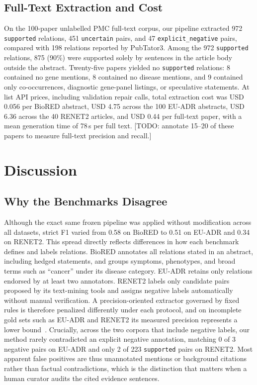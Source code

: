 \documentclass[preprint,10pt,letterpaper]{elsarticle}
\newcommand{\st}[1]{\texttt{#1}}             %
\newcommand{\todo}[1]{\textcolor{stneg}{[TODO: #1]}}
\begin{document}
\subsection{Full-Text Extraction and Cost}
On the 100-paper unlabelled PMC full-text corpus, our pipeline extracted 972 \st{supported} relations, 451 \st{uncertain} pairs, and 47 \st{explicit\_negative} pairs, compared with 198 relations reported by PubTator3. Among the 972 \st{supported} relations, 875 (90\%) were supported solely by sentences in the article body outside the abstract. Twenty-five papers yielded no \st{supported} relations: 8 contained no gene mentions, 8 contained no disease mentions, and 9 contained only co-occurrences, diagnostic gene-panel listings, or speculative statements. At list API prices, including validation repair calls, total extraction cost was USD 0.056 per BioRED abstract, USD 4.75 across the 100 EU-ADR abstracts, USD 6.36 across the 40 RENET2 articles, and USD 0.44 per full-text paper, with a mean generation time of 78\,s per full text. \todo{annotate 15--20 of these papers to measure full-text precision and recall.}

\section{Discussion}

\subsection{Why the Benchmarks Disagree}
Although the exact same frozen pipeline was applied without modification across all datasets, strict F1 varied from 0.58 on BioRED to 0.51 on EU-ADR and 0.34 on RENET2. This spread directly reflects differences in how each benchmark defines and labels relations. BioRED annotates all relations stated in an abstract, including hedged statements, and groups symptoms, phenotypes, and broad terms such as ``cancer'' under its disease category. EU-ADR retains only relations endorsed by at least two annotators. RENET2 labels only candidate pairs proposed by its text-mining tools and assigns negative labels automatically without manual verification. A precision-oriented extractor governed by fixed rules is therefore penalized differently under each protocol, and on incomplete gold sets such as EU-ADR and RENET2 its measured precision represents a lower bound~\cite{wadhwa2023revisiting,fan2024evaluating}. Crucially, across the two corpora that include negative labels, our method rarely contradicted an explicit negative annotation, matching 0 of 3 negative pairs on EU-ADR and only 2 of 223 \st{supported} pairs on RENET2. Most apparent false positives are thus unannotated mentions or background citations rather than factual contradictions, which is the distinction that matters when a human curator audits the cited evidence sentences.
\end{document}
